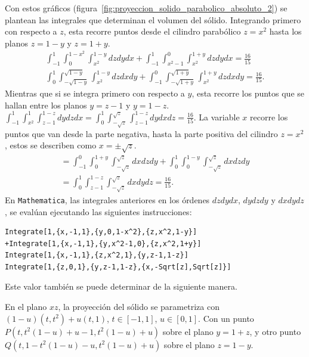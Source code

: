 Con estos gráficos (figura~\ref{fig:proyeccion_solido_parabolico_absoluto_2}) se plantean las integrales que determinan el volumen del sólido. Integrando primero con respecto a $z$, esta recorre puntos desde el cilindro parabólico $z=x^2$ hasta los planos $z=1-y$ y $z=1+y$.
\begin{multline*}
\int_{-1}^{1}\int_{0}^{1-x^2}\int_{x^2}^{1-y}dzdydx+\int_{-1}^{1}\int_{x^2-1}^{0}\int_{x^2}^{1+y}dzdydx= \frac{16}{15}\\
\int_0^1\int_{-\sqrt{1-y}}^{\sqrt{1-y}}\int_{x^2}^{1-y}dzdxdy+\int_{-1}^{0}\int_{-\sqrt{1+y}}^{\sqrt{1+y}}\int_{x^2}^{1+y}dzdxdy=\frac{16}{15}.
\end{multline*}
Mientras que si se integra primero con respecto a $y$,
esta recorre los puntos que se hallan entre los planos $y=z-1$ y $y=1-z$.
$\int_{-1}^{1}\int_{x^2}^{1}\int_{z-1}^{1-z}dydzdx=\int_{0}^{1}\int_{-\sqrt{z}}^{\sqrt{z}}\int_{z-1}^{1-z}dydxdz=\frac{16}{15}$.
La variable $x$ recorre los puntos que van desde la parte negativa, hasta la parte positiva del cilindro $z=x^2$,
estos se describen como $x=\pm \sqrt{z}$.
\begin{multline*} = \int_{-1}^{0}\int_{0}^{1+y}\int_{-\sqrt{z}}^{\sqrt{z}}dxdzdy+ \int_{0}^{1}\int_{0}^{1-y}\int_{-\sqrt{z}}^{\sqrt{z}}dxdzdy \\
=\int_{0}^{1}\int_{z-1}^{1-z}\int_{-\sqrt{z}}^{\sqrt{z}}dxdydz= \frac{16}{15}.
\end{multline*}
En \verb"Mathematica", las integrales anteriores en los órdenes $dzdydx$, $dydzdy$ y $dxdydz$,
se evalúan ejecutando las siguientes instrucciones:

\begin{tcolorbox}[title=\bf Instrucción en \verb"Mathematica"]\begin{Verbatim}[formatcom=\letraverbatim]
Integrate[1,{x,-1,1},{y,0,1-x^2},{z,x^2,1-y}]
+Integrate[1,{x,-1,1},{y,x^2-1,0},{z,x^2,1+y}]
Integrate[1,{x,-1,1},{z,x^2,1},{y,z-1,1-z}]
Integrate[1,{z,0,1},{y,z-1,1-z},{x,-Sqrt[z],Sqrt[z]}]
\end{Verbatim}
\end{tcolorbox}

Este valor también se puede determinar de la siguiente manera.


En el plano $xz$, la proyección del sólido se parametriza con
$(1-u)(t,t^2)+u(t,1)$, $t\in [-1,1]$, $u\in [0,1]$.
Con un punto $P(t,t^2(1-u)+u-1,t^2(1-u)+u) $ sobre el plano $y=1+z$, y otro punto $Q(t,1-t^2(1-u)-u,t^2(1-u)+u) $ sobre el plano $z=1-y$.

